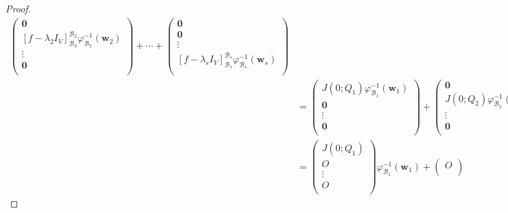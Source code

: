 \documentclass[dvipdfmx]{jsarticle}
\begin{document}
\begin{proof}
\begin{align*}
\begin{pmatrix}
\mathbf{0} \\
\left[f - \lambda_{2}I_{V} \right]_{\mathcal{B}_{2}}^{\mathcal{B}_{2}}\varphi_{\mathcal{B}_{2}}^{- 1}\left( \mathbf{w}_{2} \right) \\
 \vdots \\
\mathbf{0} \\
\end{pmatrix} + \cdots + \begin{pmatrix}
\mathbf{0} \\
\mathbf{0} \\
 \vdots \\
\left[f - \lambda_{s}I_{V} \right]_{\mathcal{B}_{s}}^{\mathcal{B}_{s}}\varphi_{\mathcal{B}_{s}}^{- 1}\left( \mathbf{w}_{s} \right) \\
\end{pmatrix} \\
&= \begin{pmatrix}
J\left( 0;Q_{1} \right)\varphi_{\mathcal{B}_{1}}^{- 1}\left( \mathbf{w}_{1} \right) \\
\mathbf{0} \\
 \vdots \\
\mathbf{0} \\
\end{pmatrix} + \begin{pmatrix}
\mathbf{0} \\
J\left( 0;Q_{2} \right)\varphi_{\mathcal{B}_{2}}^{- 1}\left( \mathbf{w}_{2} \right) \\
 \vdots \\
\mathbf{0} \\
\end{pmatrix} + \cdots + \begin{pmatrix}
\mathbf{0} \\
\mathbf{0} \\
 \vdots \\
J\left( 0;Q_{s} \right)\varphi_{\mathcal{B}_{s}}^{- 1}\left( \mathbf{w}_{s} \right) \\
\end{pmatrix} \\
&= \begin{pmatrix}
J\left( 0;Q_{1} \right) \\
O \\
 \vdots \\
O \\
\end{pmatrix}\varphi_{\mathcal{B}_{1}}^{- 1}\left( \mathbf{w}_{1} \right) + \begin{pmatrix}
O \\

\end{pmatrix}
\end{align*}
\end{proof}
\end{document}
